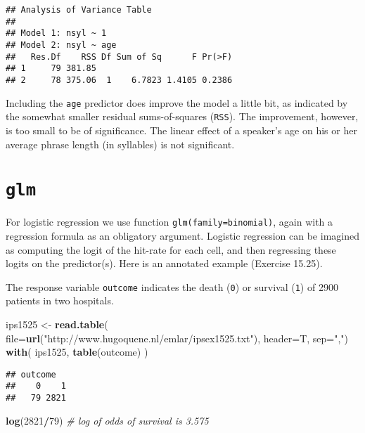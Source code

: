 \documentclass[]{book}
\newenvironment{Shaded}{\begin{snugshade}}{\end{snugshade}}
\newcommand{\CommentTok}[1]{\textcolor[rgb]{0.56,0.35,0.01}{\textit{#1}}}
\newcommand{\DataTypeTok}[1]{\textcolor[rgb]{0.13,0.29,0.53}{#1}}
\newcommand{\DecValTok}[1]{\textcolor[rgb]{0.00,0.00,0.81}{#1}}
\newcommand{\KeywordTok}[1]{\textcolor[rgb]{0.13,0.29,0.53}{\textbf{#1}}}
\newcommand{\NormalTok}[1]{#1}
\newcommand{\OperatorTok}[1]{\textcolor[rgb]{0.81,0.36,0.00}{\textbf{#1}}}
\newcommand{\StringTok}[1]{\textcolor[rgb]{0.31,0.60,0.02}{#1}}
\begin{document}
\begin{verbatim}
## Analysis of Variance Table
## 
## Model 1: nsyl ~ 1
## Model 2: nsyl ~ age
##   Res.Df    RSS Df Sum of Sq      F Pr(>F)
## 1     79 381.85                           
## 2     78 375.06  1    6.7823 1.4105 0.2386
\end{verbatim}

Including the \texttt{age} predictor does improve the model a little bit,
as indicated by the somewhat smaller residual sums-of-squares
(\texttt{RSS}). The improvement, however, is too small to be of
significance. The linear effect of a speaker's age on his or her
average phrase length (in syllables) is not significant.

\hypertarget{glm}{%
\section{\texorpdfstring{\texttt{glm}}{glm}}\label{glm}}

For logistic regression we use function
\texttt{glm(family=binomial)}, again with a
regression formula as an obligatory argument. Logistic regression
can be imagined as computing the logit of the hit-rate for each
cell, and then regressing these logits on the predictor(s). Here is
an annotated example \citep{MMC03} (Exercise 15.25).

The response variable \texttt{outcome} indicates
the death (\texttt{0}) or survival
(\texttt{1}) of 2900 patients in two hospitals.

\begin{Shaded}
\begin{Highlighting}[]
\NormalTok{ips1525 <-}\StringTok{ }\KeywordTok{read.table}\NormalTok{( }
  \DataTypeTok{file=}\KeywordTok{url}\NormalTok{(}\StringTok{"http://www.hugoquene.nl/emlar/ipsex1525.txt"}\NormalTok{),}
  \DataTypeTok{header=}\NormalTok{T, }\DataTypeTok{sep=}\StringTok{","}\NormalTok{) }
\KeywordTok{with}\NormalTok{( ips1525, }\KeywordTok{table}\NormalTok{(outcome) ) }
\end{Highlighting}
\end{Shaded}

\begin{verbatim}
## outcome
##    0    1 
##   79 2821
\end{verbatim}

\begin{Shaded}
\begin{Highlighting}[]
\KeywordTok{log}\NormalTok{(}\DecValTok{2821}\OperatorTok{/}\DecValTok{79}\NormalTok{) }\CommentTok{# log of odds of survival is 3.575}
\end{Highlighting}
\end{Shaded}
\end{document}
